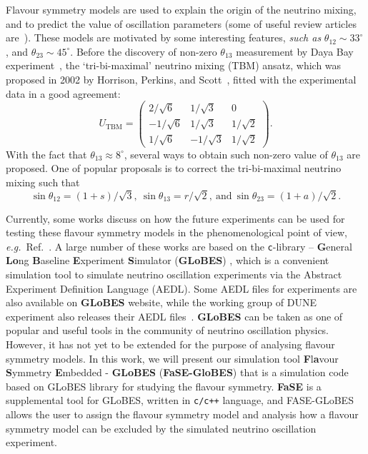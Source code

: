 \documentclass[aps,prd,nofootinbib,preprint]{revtex4}
\begin{document}
Flavour symmetry models are used to explain the origin of the neutrino mixing, and to predict the value of oscillation parameters (some of useful review articles are~\cite{Altarelli:2010gt,Ishimori:2010au,King:2013eh,King:2014nza,King:2015aea,King:2015ata,King:2017guk}). These models are motivated by some interesting features, \textit{such as} $\theta_{12}\sim 33^\circ$, and $\theta_{23}\sim 45^\circ$. Before the discovery of non-zero $\theta_{13}$ measurement by Daya Bay experiment~\cite{An:2013zwz}, the `tri-bi-maximal' neutrino mixing (TBM) ansatz, which was proposed in 2002 by Horrison, Perkins, and Scott~\cite{Harrison:2002er}, fitted with the experimental data in a good agreement:
\begin{equation*}
U_{\text{TBM}}=\left(
\begin{array}{ccc}
2/\sqrt{6} & 1/\sqrt{3} & 0\\
-1/\sqrt{6} & 1/\sqrt{3} & 1/\sqrt{2}\\
1/\sqrt{6}  & -1/\sqrt{3} & 1/\sqrt{2}
\end{array}\right).
\end{equation*} 
With the fact that $\theta_{13}\approx 8^\circ$, several ways to obtain such non-zero value of $\theta_{13}$ are proposed. One of popular proposals is to correct the tri-bi-maximal neutrino mixing such that 
\begin{equation*}
\sin\theta_{12}=(1+s)/\sqrt{3},~\sin\theta_{13}=r/\sqrt{2},~\text{and}~\sin\theta_{23}=(1+a)/\sqrt{2}.
\end{equation*}

Currently, some works discuss on how the future experiments can be used for testing these flavour symmetry models in the phenomenological point of view, \textit{e.g.}~Ref.~\cite{Ballett:2016yod,Chatterjee:2017xkb,Ding:2019zhn,Tang:2019edw}. A large number of these works are based on the \texttt{c}-library -- \textbf{G}eneral \textbf{Lo}ng \textbf{B}aseline \textbf{E}xperiment \textbf{S}imulator (\textbf{GLoBES}) \cite{Huber:2004ka,Huber:2007ji}, which is a convenient simulation tool to simulate neutrino oscillation experiments via the Abstract Experiment Definition Language (AEDL). Some AEDL files for experiments are also available on \textbf{GLoBES} website, while the working group of DUNE experiment also releases their AEDL files~\cite{Alion:2016uaj}.  \textbf{GLoBES} can be taken as one of popular and useful tools in the community of neutrino oscillation physics. However, it has not yet to be extended for the purpose of analysing flavour symmetry models.  In this work, we will present our simulation tool \textbf{F}l\textbf{a}vour \textbf{S}ymmetry \textbf{E}mbedded - \textbf{GLoBES} (\textbf{FaSE-GloBES}) that is a simulation code based on GLoBES library for studying the flavour symmetry. \textbf{FaSE} is a supplemental tool for GLoBES, written in \texttt{c/c++} language, and FASE-GLoBES allows the user to assign the flavour symmetry model and analysis how a flavour symmetry model can be excluded by the simulated neutrino oscillation experiment.
\end{document}
